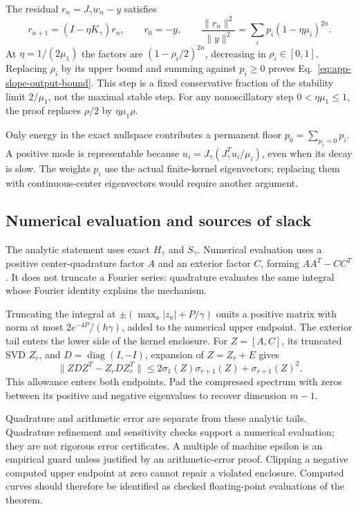 The residual $r_n=J_\gamma w_n-y$ satisfies
\begin{equation}
 r_{n+1}=(I-\eta K_\gamma)r_n,\qquad r_0=-y,\qquad
 \frac{\|r_n\|^2}{\|y\|^2}=
 \sum_i p_i(1-\eta\mu_i)^{2n}.
\end{equation}
At $\eta=1/(2\mu_1)$ the factors are $(1-\rho_i/2)^{2n}$, decreasing in
$\rho_i\in[0,1]$. Replacing $\rho_i$ by its upper bound and summing against
$p_i\ge0$ proves Eq.~\eqref{eq:app-slope-output-bound}. This step is a fixed
conservative fraction of the stability limit $2/\mu_1$, not the maximal stable
step. For any nonoscillatory step $0<\eta\mu_1\le1$, the proof replaces
$\rho/2$ by $\eta\mu_1\rho$.

Only energy in the exact nullspace contributes a permanent floor
$p_0=\sum_{\mu_i=0}p_i$. A positive mode is representable because
$u_i=J_\gamma(J_\gamma^Tu_i/\mu_i)$, even when its decay is slow. The weights
$p_i$ use the actual finite-kernel eigenvectors; replacing them with
continuous-center eigenvectors would require another argument.

\subsection{Numerical evaluation and sources of slack}
The analytic statement uses exact $H_\gamma$ and $S_\gamma$. Numerical
evaluation uses a positive center-quadrature factor $A$ and an exterior factor
$C$, forming $AA^T-CC^T$. It does not truncate a Fourier series: quadrature
evaluates the same integral whose Fourier identity explains the mechanism.

Truncating the integral at
$\pm(\max_a|z_a|+P/\gamma)$ omits a positive matrix with norm at most
$2e^{-4P}/(h\gamma)$, added to the numerical upper endpoint. The exterior tail
enters the lower side of the kernel enclosure. For $Z=[A,C]$, its truncated SVD $Z_r$, and
$D=\operatorname{diag}(I,-I)$, expansion of $Z=Z_r+E$ gives
\begin{equation}
 \|ZDZ^T-Z_rDZ_r^T\|
 \le2\sigma_1(Z)\sigma_{r+1}(Z)+\sigma_{r+1}(Z)^2.
\end{equation}
This allowance enters both endpoints. Pad the compressed spectrum with zeros
between its positive and negative eigenvalues to recover dimension $m-1$.

Quadrature and arithmetic error are separate from these analytic tails.
Quadrature refinement and sensitivity checks support a numerical evaluation;
they are not rigorous error certificates. A multiple of machine epsilon is an
empirical guard unless justified by an arithmetic-error proof. Clipping a
negative computed upper endpoint at zero cannot repair a violated enclosure.
Computed curves should therefore be identified as checked floating-point
evaluations of the theorem.

